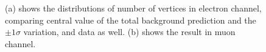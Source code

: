 \begin{figure}[hbtp]
  \centering
  \hspace{0.5cm}
  \caption{\label{fig:SYS_PU}(a) shows the distributions of number of vertices in electron channel, comparing central value of the total background prediction and the $\pm1\sigma$ variation, and data as well. (b) shows the result in muon channel.}
\end{figure}

